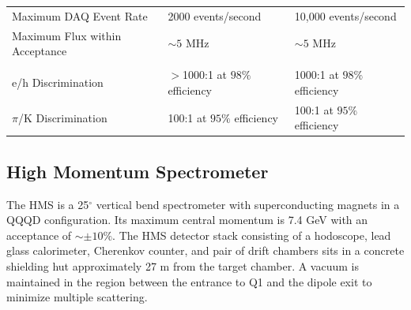 \begin{table}[h]
{\begin{tabular}[t]{lll}
            Maximum DAQ Event Rate               & 2000 events/second             & 10,000 events/second        \\
            Maximum Flux within Acceptance       & $\sim 5$ MHz                   & $\sim 5$ MHz                \\
                                                                                                                \\
            e/h Discrimination                   & $>$1000:1 at $98\%$ efficiency & 1000:1 at $98\%$ efficiency \\
            $\pi$/K Discrimination               & 100:1 at $95\%$ efficiency     & 100:1 at $95\%$ efficiency  \\
            \hline
        \end{tabular}
    } %
\end{table}

\subsection{High Momentum Spectrometer}
The HMS is a 25$^{\circ}$ vertical bend spectrometer with superconducting
magnets in a QQQD configuration.
Its maximum central momentum is 7.4 GeV with an acceptance of $\sim\pm10\%$.
The HMS detector stack consisting of a hodoscope, lead glass calorimeter,
Cherenkov counter, and pair of drift chambers sits in a concrete shielding
hut approximately 27 m from the target chamber.
A vacuum is maintained in the region between the entrance to Q1 and
the dipole exit to minimize multiple scattering.

